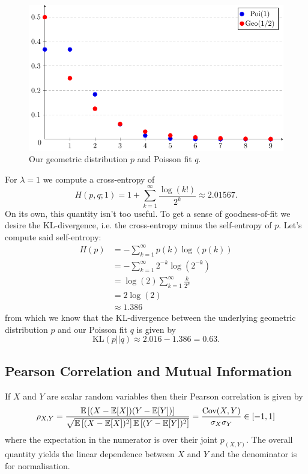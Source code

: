 \documentclass[11pt]{article}
\begin{document}
\begin{appendices}
\begin{figure}[t]
    \centering
    \includegraphics[width=\columnwidth]{./figures/appendix/poi_geo_plot.pdf}
    \caption{Our geometric distribution $p$ and Poisson fit $q$.}
    \label{fig:poi_geo_plot}
\end{figure}

For $\lambda=1$ we compute a cross-entropy of
$$
H(p,q;1)
=
1+\sum_{k=1}^{\infty}\frac{\log(k!)}{2^k}
\approx
2.01567.
$$
On its own, this quantity isn't too useful. To get a sense of goodness-of-fit we desire the KL-divergence, i.e. the cross-entropy minus the self-entropy of $p$. Let's compute said self-entropy:
\begin{align*}
    H(p)
    &=
    -\sum_{k=1}^{\infty}p(k)\log(p(k))\\
    &=
    -\sum_{k=1}^{\infty}2^{-k}\log(2^{-k})\\
    &=
    \log(2)\sum_{k=1}^{\infty}\frac{k}{2^k}\\
    &=
    2\log(2)\\
    &\approx
    1.386
\end{align*}
from which we know that the KL-divergence between the underlying geometric distribution $p$ and our Poisson fit $q$ is given by
$$
\text{KL}(p||q)
\approx
2.016-1.386
=
0.63.
$$

\subsection{Pearson Correlation and Mutual Information}
\label{app:pearson_correlation}
If $X$ and $Y$ are scalar random variables then their Pearson correlation is given by
$$
\rho_{X,Y}
=
\frac{\mathbb{E}\left[(X-\mathbb{E}[X])(Y-\mathbb{E}[Y])\right]}{\sqrt{\mathbb{E}\left[(X-\mathbb{E}[X])^2\right]\mathbb{E}\left[(Y-\mathbb{E}[Y])^2\right]}}
=
\frac{\text{Cov}(X,Y)}{\sigma_X\sigma_Y}
\in[-1,1]
$$
where the expectation in the numerator is over their joint $p_{(X,Y)}$. The overall quantity yields the linear dependence between $X$ and $Y$ and the denominator is for normalisation.


\end{appendices}
\end{document}
